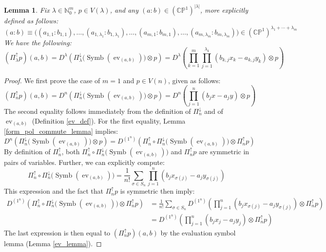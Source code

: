 \documentclass{article}
\newtheorem{lemma}[theorem]{Lemma}
\theoremstyle{definition}
\theoremstyle{plain}
\newcommand{\N}{\mathbb{N}}
\newcommand{\CP}{\mathbb{CP}}
\DeclareMathOperator{\Symb}{Symb}
\DeclareMathOperator{\ev}{ev}
\begin{document}
\begin{lemma}
    Fix $\lambda \in \N_0^m$, $p \in V(\lambda)$, and any $(a:b) \in (\CP^1)^{|\lambda|}$, more explicitly defined as follows:
    \[
        (a:b) \equiv \big((a_{1,1}:b_{1,1}), \ldots, (a_{1,\lambda_1}:b_{1,\lambda_1}), \ldots, (a_{m,1}:b_{m,1}), \ldots, (a_{m,\lambda_m}:b_{m,\lambda_m})\big) \in (\CP^1)^{\lambda_1 + \cdots + \lambda_m}
    \]
    We have the following:
    \[
        (\Pi_\lambda^\uparrow p)(a,b) = D^\lambda\left(\Pi_\lambda^\downarrow\big(\Symb(\ev_{(a,b)})\big) \otimes p\right) = D^\lambda\left(\prod_{k=1}^m \prod_{j=1}^{\lambda_k} (b_{k,j}x_k - a_{k,j}y_k) \otimes p \right)
    \]
\end{lemma}
\begin{proof}
    We first prove the case of $m=1$ and $p \in V(n)$, given as follows:
    \[
        (\Pi^\uparrow_n p)(a,b) = D^n\left(\Pi_n^\downarrow\big(\Symb(\ev_{(a,b)})\big) \otimes p\right) = D^n\left(\prod_{j=1}^n (b_jx - a_jy) \otimes p \right)
    \]
    The second equality follows immediately from the definition of $\Pi_n^\downarrow$ and of $\ev_{(a,b)}$ (Definition \ref{ev_def}). For the first equality, Lemma \ref{form_pol_commute_lemma} implies:
    \[
        D^n\left(\Pi_n^\downarrow\big(\Symb(\ev_{(a,b)})\big) \otimes p\right) = D^{(1^n)}\left(\Pi_n^\uparrow \circ \Pi_n^\downarrow\big(\Symb(\ev_{(a,b)})\big) \otimes \Pi_n^\uparrow p\right)
    \]
    By definition of $\Pi_n^\uparrow$, both $\Pi_n^\uparrow \circ \Pi_n^\downarrow\big(\Symb(\ev_{(a,b)})\big)$ and $\Pi_n^\uparrow p$ are symmetric in pairs of variables. Further, we can explicitly compute:
    \[
        \Pi_n^\uparrow \circ \Pi_n^\downarrow\big(\Symb(\ev_{(a,b)})\big) = \frac{1}{n!} \sum_{\sigma \in S_n} \prod_{j=1}^n (b_jx_{\sigma(j)} - a_jy_{\sigma(j)}) %
    \]
    This expression and the fact that $\Pi_n^\uparrow p$ is symmetric then imply:
    \[
    \begin{split}
        D^{(1^n)}\left(\Pi_n^\uparrow \circ \Pi_n^\downarrow\big(\Symb(\ev_{(a,b)})\big) \otimes \Pi_n^\uparrow p\right) &= \frac{1}{n!} \sum_{\sigma \in S_n} D^{(1^n)}\left(\prod_{j=1}^n (b_jx_{\sigma(j)} - a_jy_{\sigma(j)}) \otimes \Pi_n^\uparrow p\right) \\
            &= D^{(1^n)}\left(\prod_{j=1}^n (b_jx_j - a_jy_j) \otimes \Pi_n^\uparrow p\right)
    \end{split}
    \]
    The last expression is then equal to $(\Pi^\uparrow_n p)(a,b)$ by the evaluation symbol lemma (Lemma \ref{ev_lemma}).


\end{proof}
\end{document}
